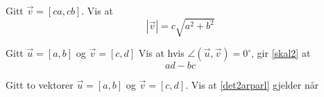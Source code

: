



	
\opgt
{}
Gitt $ \vec{v}=[ca, cb] $. Vis at 
\[ |\vec{v}|=c\sqrt{a^2+b^2} \]

Gitt $ \vec{u}=[a,b] $ og $ \vec{v}=[c, d] $
Vis at hvis $\angle(\vec{u}, \vec{v})=0^\circ $, gir \eqref{skal2} at
\[ ad-bc \]

Gitt to vektorer $ \vec{u}=[a, b] $ og $ \vec{v}=[c, d] $.
Vis at \eqref{det2arparl} gjelder når
